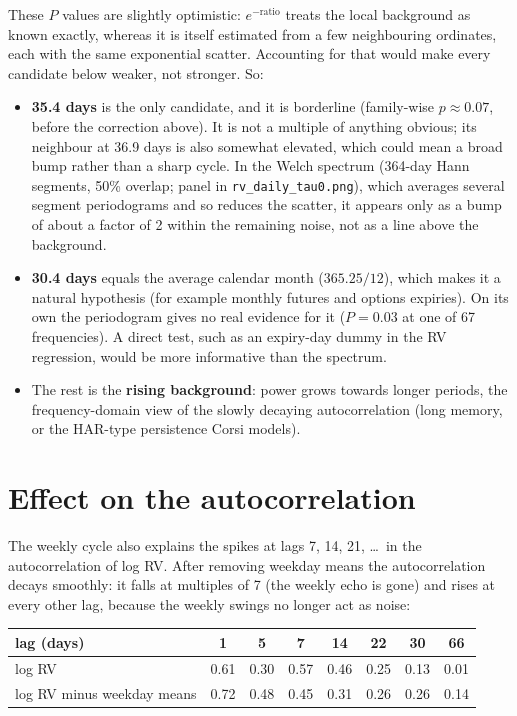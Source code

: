 \documentclass[11pt]{article}
\numberwithin{equation}{section}
\begin{document}
These $P$ values are slightly optimistic: $e^{-\text{ratio}}$ treats the local background as known exactly, whereas it is itself estimated from a few neighbouring ordinates, each with the same exponential scatter. Accounting for that would make every candidate below weaker, not stronger. So:
\begin{itemize}
\item \textbf{35.4 days} is the only candidate, and it is borderline (family-wise $p \approx 0.07$, before the correction above). It is not a multiple of anything obvious; its neighbour at 36.9 days is also somewhat elevated, which could mean a broad bump rather than a sharp cycle. In the Welch spectrum (364-day Hann segments, 50\% overlap; panel in \texttt{rv\_daily\_tau0.png}), which averages several segment periodograms and so reduces the scatter, it appears only as a bump of about a factor of 2 within the remaining noise, not as a line above the background.
\item \textbf{30.4 days} equals the average calendar month ($365.25/12$), which makes it a natural hypothesis (for example monthly futures and options expiries). On its own the periodogram gives no real evidence for it ($P = 0.03$ at one of 67 frequencies). A direct test, such as an expiry-day dummy in the RV regression, would be more informative than the spectrum.
\item The rest is the \textbf{rising background}: power grows towards longer periods, the frequency-domain view of the slowly decaying autocorrelation (long memory, or the HAR-type persistence Corsi models).
\end{itemize}

\section{Effect on the autocorrelation}

The weekly cycle also explains the spikes at lags 7, 14, 21, \dots\ in the autocorrelation of log RV. After removing weekday means the autocorrelation decays smoothly: it falls at multiples of 7 (the weekly echo is gone) and rises at every other lag, because the weekly swings no longer act as noise:

\begin{center}
\begin{tabular}{lccccccc}
\toprule
lag (days) & 1 & 5 & 7 & 14 & 22 & 30 & 66 \\
\midrule
log RV & 0.61 & 0.30 & 0.57 & 0.46 & 0.25 & 0.13 & 0.01 \\
log RV minus weekday means & 0.72 & 0.48 & 0.45 & 0.31 & 0.26 & 0.26 & 0.14 \\
\bottomrule
\end{tabular}
\end{center}
\end{document}

